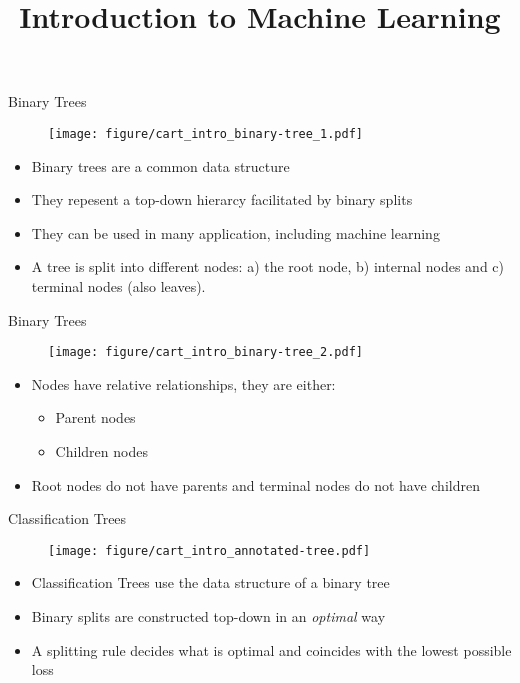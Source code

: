 \documentclass[11pt,compress,t,notes=noshow, xcolor=table]{beamer}
\title{Introduction to Machine Learning}
\institute{\href{https://compstat-lmu.github.io/lecture_i2ml/}{compstat-lmu.github.io/lecture\_i2ml}}
\date{}
\begin{document}
\sloppy

\begin{vbframe}{Binary Trees}
    \begin{figure}
    \centering
      \texttt{[image: figure/cart\_intro\_binary-tree\_1.pdf]}
    \end{figure}
  \begin{itemize}
    \item Binary trees are a common data structure
    \item They repesent a top-down hierarcy facilitated by binary splits
    \item They can be used in many application, including machine learning
    \item A tree is split into different nodes: a) the root node, b) internal nodes and c) terminal nodes (also leaves).
  \end{itemize}
\end{vbframe}

\begin{vbframe}{Binary Trees}
    \begin{figure}
    \centering
      \texttt{[image: figure/cart\_intro\_binary-tree\_2.pdf]}
    \end{figure}
  \begin{itemize}
    \item Nodes have relative relationships, they are either:
    \begin{itemize}
    \item Parent nodes
    \item Children nodes
    \end{itemize}
    \item Root nodes do not have parents and terminal nodes do not have children
  \end{itemize}
\end{vbframe}

\begin{vbframe}{Classification Trees}
    \begin{figure}
    \centering
      \texttt{[image: figure/cart\_intro\_annotated-tree.pdf]}
    \end{figure}
  \begin{itemize}
    \item Classification Trees use the data structure of a binary tree
    \item Binary splits are constructed top-down in an \emph{optimal} way
    \item A splitting rule decides what is optimal and coincides with the lowest possible loss
  \end{itemize}
\end{vbframe}
\end{document}
